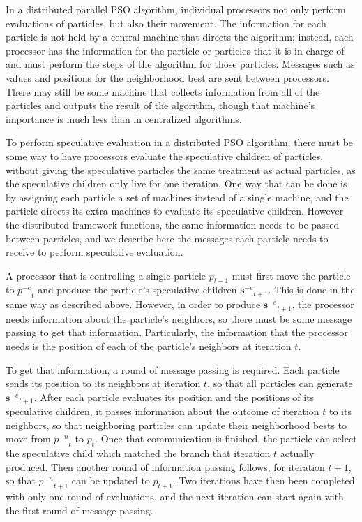 \documentclass[journal,letterpaper]{IEEEtran}
\providecommand{\noeval}[1]{\ensuremath{#1^{-e}}}
\providecommand{\nonbest}[1]{\ensuremath{#1^{-n}}}
\providecommand{\p}{\ensuremath{p}}
\providecommand{\sset}{\ensuremath{\mathbf{s}}}
\begin{document}
\label{sec:distributed}

In a distributed parallel PSO algorithm, individual processors not only perform
evaluations of particles, but also their movement.  The information for each
particle is not held by a central machine that directs the algorithm; instead,
each processor has the information for the particle or particles that it is in
charge of and must perform the steps of the algorithm for those particles.
Messages such as values and positions for the neighborhood best are sent
between processors.  There may still be some machine that collects information
from all of the particles and outputs the result of the algorithm, though that
machine's importance is much less than in centralized algorithms.

To perform speculative evaluation in a distributed PSO algorithm, there must be
some way to have processors evaluate the speculative children of particles,
without giving the speculative particles the same treatment as actual
particles, as the speculative children only live for one iteration.  One way
that can be done is by assigning each particle a set of machines instead of a
single machine, and the particle directs its extra machines to evaluate its
speculative children.  However the distributed framework functions, the same
information needs to be passed between particles, and we describe here the
messages each particle needs to receive to perform speculative evaluation.

A processor that is controlling a single particle $\p_{t-1}$ must first move
the particle to $\noeval{\p}_t$ and produce the particle's speculative children
$\noeval{\sset}_{t+1}$.  This is done in the same way as described above.
However, in order to produce $\noeval{\sset}_{t+1}$, the processor needs
information about the particle's neighbors, so there must be some message
passing to get that information.  Particularly, the information that the
processor needs is the position of each of the particle's neighbors at
iteration $t$.

To get that information, a round of message passing is required.  Each particle
sends its position to its neighbors at iteration $t$, so that all particles can
generate $\noeval{\sset}_{t+1}$.  After each particle evaluates its position
and the positions of its speculative children, it passes information about the
outcome of iteration $t$ to its neighbors, so that neighboring particles can
update their neighborhood bests to move from $\nonbest{\p}_t$ to $\p_t$.  Once
that communication is finished, the particle can select the speculative child
which matched the branch that iteration $t$ actually produced.  Then another
round of information passing follows, for iteration $t+1$, so that
$\nonbest{\p}_{t+1}$ can be updated to $\p_{t+1}$.  Two iterations have then
been completed with only one round of evaluations, and the next iteration can
start again with the first round of message passing.
\end{document}
